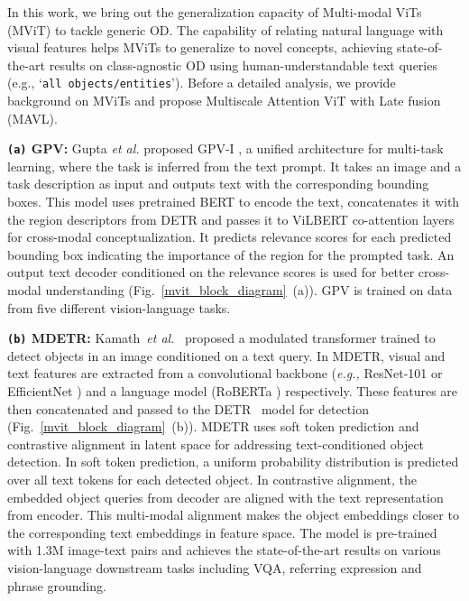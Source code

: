 \documentclass[runningheads]{llncs}
\def\eg{\emph{e.g.,}\xspace} \def\Eg{\emph{E.g.}\xspace}
\def\etal{\emph{et al.}\xspace}
\newcommand{\txt}[1]{{\texttt{#1}}}
\begin{document}
In this work, we bring out the generalization capacity of Multi-modal ViTs (MViT) to tackle generic OD. The capability of relating natural language with visual features helps MViTs to generalize to novel concepts, achieving state-of-the-art results on class-agnostic OD using human-understandable text queries (e.g., ‘\txt{all objects/entities}’). Before a detailed analysis, we provide background on MViTs and propose Multiscale Attention ViT with Late fusion (MAVL).

\noindent \textbf{\txt{(a)} GPV:}  Gupta \etal proposed GPV-I \cite{gpv1}, a unified architecture for multi-task learning, where the task is inferred from the text prompt. It takes an image and a task description as input and outputs text with the corresponding bounding boxes. This model uses pretrained BERT \cite{BERT} to encode the text, concatenates it with the region descriptors from DETR \cite{DETR} and passes it to ViLBERT \cite{ViLBERT} co-attention layers for cross-modal conceptualization. It predicts relevance scores for each predicted bounding box indicating the importance of the region for the prompted task. An output text decoder conditioned on the relevance scores is used for better cross-modal understanding (Fig.~\ref{mvit_block_diagram}~(a)). 
GPV is trained on data from five different vision-language tasks.


\noindent \textbf{\txt{(b)} MDETR:} Kamath~\etal~\cite{mdetr} proposed a modulated transformer  trained to detect objects in an image conditioned on a text query. In MDETR, visual and text features are extracted from a convolutional backbone (\eg ResNet-101 \cite{he2016deep} or EfficientNet \cite{tan2019efficientnet}) and a language model (RoBERTa \cite{roberta}) respectively. These features are then concatenated and passed to the DETR~\cite{DETR} model for detection (Fig.~\ref{mvit_block_diagram}~(b)). MDETR uses soft token prediction and contrastive alignment in latent space for addressing text-conditioned object detection. In soft token prediction, a uniform probability distribution is predicted over all text tokens for each detected object. In contrastive alignment, the embedded object queries from decoder are aligned with the text representation from encoder. This multi-modal alignment makes the object embeddings closer to the corresponding text embeddings in feature space. The model is pre-trained with 1.3M image-text pairs and achieves the state-of-the-art results on various vision-language downstream tasks including VQA, referring expression and phrase grounding. 
\end{document}
